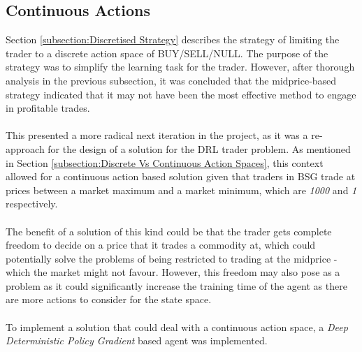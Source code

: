 \documentclass[ %
                    author={Ashwinder Khurana},
                supervisor={Prof Dave Cliff},
                    degree={MEng},
                     title={The Deeply Reinforced Trader},
                  subtitle={},
                      type={enterprise},
                      year={2020} ]{dissertation}
\begin{document}
{\subsection{Continuous Actions}
Section \ref{subsection:Discretised Strategy} describes the strategy of limiting the trader to a discrete action space of BUY/SELL/NULL. The purpose of the strategy was to simplify the learning task for the trader. However, after thorough analysis in the previous subsection, it was concluded that the midprice-based strategy indicated that it may not have been the most effective method to engage in profitable trades.
\\
\\
\noindent
This presented a more radical next iteration in the project, as it was a re-approach for the design of a solution for the DRL trader problem. As mentioned in Section \ref{subsection:Discrete Vs Continuous Action Spaces}, this context allowed for a continuous action based solution given that traders in BSG trade at prices between a market maximum and a market minimum, which are \textit{1000} and \textit{1} respectively. 
\\
\\
The benefit of a solution of this kind could be that the trader gets complete freedom to decide on a price that it trades a commodity at, which could potentially solve the problems of being restricted to trading at the midprice - which the market might not favour. However, this freedom may also pose as a problem as it could significantly increase the training time of the agent as there are more actions to consider for the state space. 
\\
\\
To implement a solution that could deal with a continuous action space, a \textit{Deep Deterministic Policy Gradient} based agent was implemented.
}
\end{document}
